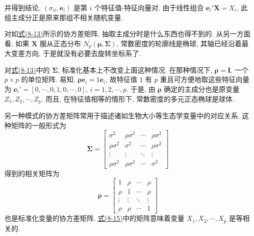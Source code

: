 
并得到结论, $(\sigma_{ii},\mathbf{e}_i)$ 是第 $i$ 个特征值-特征向量对. 由于线性组合 $\mathbf{e}_i'\mathbf{X}=X_i$, 此组主成分正是原来那组不相关随机变量.

对如\hyperref[eq:8-13]{式(8-13)}所示的协方差矩阵, 抽取主成分时是什么东西也得不到的. 从另一方面看, 如果 $\mathbf{X}$ 服从正态分布 $N_p(\boldsymbol{\mu},\boldsymbol{\Sigma})$, 常数密度的轮廓线是椭球, 其轴已经沿着最大变差方向, 于是就没有必要去旋转坐标系了.

对\hyperref[eq:8-13]{式(8-13)}中的 $\boldsymbol{\Sigma}$, 标准化基本上不改变上面这种情况. 在那种情况下, $\boldsymbol{\rho}=\boldsymbol{I}$, 一个 $p\times p$ 的单位矩阵. 易知, $\boldsymbol{\rho}\mathbf{e}_i=1\mathbf{e}_i$, 故特征值 1 有 $p$ 重且可方便地取这些特征向量为 $\mathbf{e}_i'=[0,\cdots,0,1,0,\cdots,0]$, $i=1,2,\cdots,p$. 于是, 由 $\boldsymbol{\rho}$ 确定的主成分也是原变量 $Z_1,Z_2,\cdots,Z_p$. 而且, 在特征值相等的情形下, 常数密度的多元正态椭球是球体.

另一种模式的协方差矩阵常用于描述诸如生物大小等生态学变量中的对应关系. 这种矩阵的一般形式为
\label{eq:8-14}
\begin{equation}
\boldsymbol{\Sigma}=\begin{bmatrix}
\sigma^2&\rho\sigma^2&\cdots&\rho\sigma^2\\
\rho\sigma^2&\sigma^2&\cdots&\rho\sigma^2\\
\vdots&\vdots&\ddots&\vdots\\
\rho\sigma^2&\rho\sigma^2&\cdots&\sigma^2
\end{bmatrix}
\tag{8-14}
\end{equation}
得到的相关矩阵为
\label{eq:8-15}
\begin{equation}
\boldsymbol{\rho}=\begin{bmatrix}
1&\rho&\cdots&\rho\\
\rho&1&\cdots&\rho\\
\vdots&\vdots&\ddots&\vdots\\
\rho&\rho&\cdots&1
\end{bmatrix}
\tag{8-15}
\end{equation}
也是标准化变量的协方差矩阵. \hyperref[eq:8-15]{式(8-15)}中的矩阵意味着变量 $X_1,X_2,\cdots,X_p$ 是等相关的.

